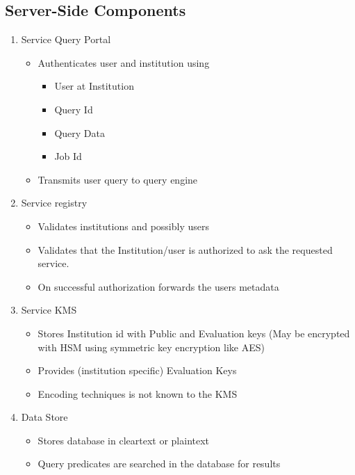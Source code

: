 \subsection{Server-Side Components}
\begin{enumerate}
    \item Service Query Portal
          \begin{itemize}
              \item Authenticates user and institution using
                    \begin{itemize}
                        \item User at Institution
                        \item Query Id
                        \item Query Data
                        \item Job Id
                    \end{itemize}
              \item Transmits user query to query engine
          \end{itemize}
    \item Service registry
          \begin{itemize}
              \item Validates institutions and possibly users
              \item Validates that the Institution/user is authorized to ask the requested service.
              \item On successful authorization forwards the users metadata
          \end{itemize}
    \item Service KMS
          \begin{itemize}
              \item Stores Institution id with Public and Evaluation keys (May be encrypted with HSM using symmetric key encryption like AES)
              \item Provides (institution specific) Evaluation Keys
              \item Encoding techniques is not known to the KMS
          \end{itemize}
    \item Data Store
          \begin{itemize}
              \item Stores database in cleartext or plaintext
              \item Query predicates are searched in the database for results

\end{itemize}
\end{enumerate}
